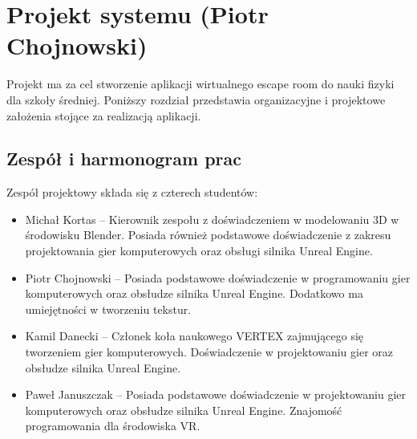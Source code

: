\chapter{Projekt systemu (Piotr Chojnowski)}
\label{chap:project}

Projekt ma za cel stworzenie aplikacji wirtualnego escape room do nauki fizyki dla szkoły średniej. Poniższy rozdział przedstawia organizacyjne i projektowe założenia stojące za realizacją aplikacji.

\section{Zespół i harmonogram prac}
Zespół projektowy składa się z czterech studentów:

\begin{itemize}
    \item Michał Kortas -- Kierownik zespołu z doświadczeniem w modelowaniu 3D w środowisku Blender. Posiada również podstawowe doświadczenie z zakresu projektowania gier komputerowych oraz obsługi silnika Unreal Engine.
    \item Piotr Chojnowski -- Posiada podstawowe doświadczenie w programowaniu gier komputerowych oraz obsłudze silnika Unreal Engine. Dodatkowo ma umiejętności w tworzeniu tekstur.
    \item Kamil Danecki -- Członek koła naukowego VERTEX zajmującego się tworzeniem gier komputerowych. Doświadczenie w projektowaniu gier oraz obsłudze silnika Unreal Engine.
    \item Paweł Januszczak -- Posiada podstawowe doświadczenie w projektowaniu gier komputerowych oraz obsłudze silnika Unreal Engine. Znajomość programowania dla środowiska VR.
\end{itemize}
\hfill
\newline
